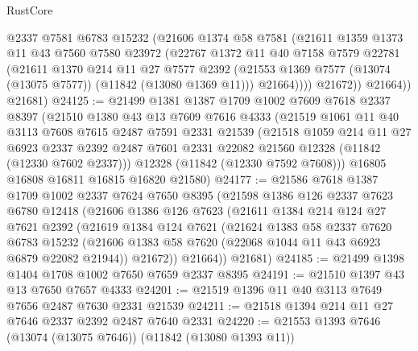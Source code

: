 \begin{lexlean}{RustCore}
\begin{coremodule}
              @2337
              @7581
              @6783
              @15232
              (@21606
                @1374
                @58
                @7581
                (@21611
                  @1359
                  @1373
                  @11
                  @43
                  @7560
                  @7580
                  @23972
                  (@22767
                    @1372
                    @11
                    @40
                    @7158
                    @7579
                    @22781
                    (@21611
                      @1370
                      @214
                      @11
                      @27
                      @7577
                      @2392
                      (@21553 @1369 @7577 (@13074 (@13075 @7577)) (@11842 (@13080 @1369 @11)))
                      @21664))))
              @21672))
          @21664))
      @21681)
@24125 := @21499
    @1381
    @1387
    @1709
    @1002
    @7609
    @7618
    @2337
    @8397
    (@21510
      @1380
      @43
      @13
      @7609
      @7616
      @4333
      (@21519
        @1061
        @11
        @40
        @3113
        @7608
        @7615
        @2487
        @7591
        @2331
        @21539
        (@21518
          @1059
          @214
          @11
          @27
          @6923
          @2337
          @2392
          @2487
          @7601
          @2331
          @22082
          @21560
          @12328
          (@11842 (@12330 @7602 @2337)))
        @12328
        (@11842 (@12330 @7592 @7608)))
      @16805
      @16808
      @16811
      @16815
      @16820
      @21580)
@24177 := @21586
    @7618
    @1387
    @1709
    @1002
    @2337
    @7624
    @7650
    @8395
    (@21598
      @1386
      @126
      @2337
      @7623
      @6780
      @12418
      (@21606
        @1386
        @126
        @7623
        (@21611
          @1384
          @214
          @124
          @27
          @7621
          @2392
          (@21619
            @1384
            @124
            @7621
            (@21624
              @1383
              @58
              @2337
              @7620
              @6783
              @15232
              (@21606 @1383 @58 @7620 (@22068 @1044 @11 @43 @6923 @6879 @22082 @21944))
              @21672))
          @21664))
      @21681)
@24185 := @21499 @1398 @1404 @1708 @1002 @7650 @7659 @2337 @8395
@24191 := @21510 @1397 @43 @13 @7650 @7657 @4333
@24201 := @21519 @1396 @11 @40 @3113 @7649 @7656 @2487 @7630 @2331 @21539
@24211 := @21518 @1394 @214 @11 @27 @7646 @2337 @2392 @2487 @7640 @2331
@24220 := @21553 @1393 @7646 (@13074 (@13075 @7646)) (@11842 (@13080 @1393 @11))

\end{coremodule}
\end{lexlean}
